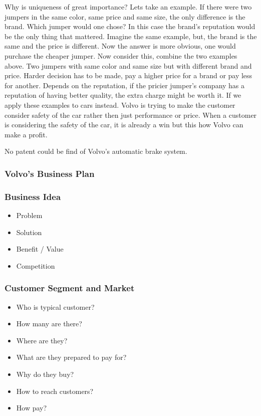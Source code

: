 \documentclass[conference]{IEEEtran}
\begin{document}
Why is uniqueness of great importance? Lets take an example. If there were two jumpers in the same color, same price and same size, the only difference is the brand. Which jumper would one chose? In this case the brand's reputation would be the only thing that mattered. Imagine the same example, but, the brand is the same and the price is different. Now the answer is more obvious, one would purchase the cheaper jumper. Now consider this, combine the two examples above. Two jumpers with same color and same size but with different brand and price. Harder decision has to be made, pay a higher price for a brand or pay less for another. Depends on the reputation, if the pricier jumper's company has a reputation of having better quality, the extra charge might be worth it. If we apply these examples to cars instead. Volvo is trying to make the customer consider safety of the car rather then just performance or price. When a customer is considering the safety of the car, it is already a win but this how Volvo can make a profit.

No patent could be find of Volvo's automatic brake system.
\subsubsection{Volvo's Business Plan}
\subsubsection{Business Idea}
\begin{itemize}
	\item Problem
	\item Solution
	\item Benefit / Value
	\item Competition
\end{itemize}
\subsubsection{Customer Segment and Market}
\begin{itemize}
	\item Who is typical customer?
	\item How many are there?
	\item Where are they?
	\item  What are they prepared to pay for?
	\item Why do they buy?
	\item How to reach customers?
	\item How pay?
\end{itemize}
\end{document}
